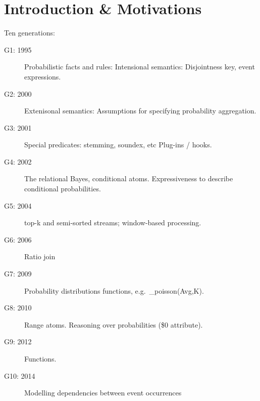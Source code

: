 \section{Introduction \& Motivations}



Ten generations:

\begin{description}
\item[G1: 1995]
	Probabilistic facts and rules:
	Intensional semantics: Disjointness key, event expressions.

\item[G2: 2000]
	Extenisonal semantics:
	Assumptions for specifying probability aggregation.

\item[G3: 2001]
	Special predicates: stemming, soundex, etc
	Plug-ins / hooks.

\item[G4: 2002]
	The relational Bayes, conditional atoms.
	Expressiveness to describe conditional probabilities.

\item[G5: 2004]
	top-k and semi-sorted streams; window-based processing.

\item[G6: 2006]
	Ratio join

\item[G7: 2009]
	Probability distributions functions, e.g.~\_poisson(Avg,K).

\item[G8: 2010]
	Range atoms. Reasoning over probabilities (\$0 attribute).

\item[G9: 2012]
	Functions.

\item[G10: 2014]
	Modelling dependencies between event occurrences

\end{description}


